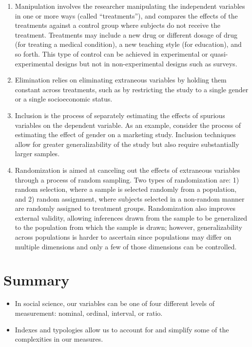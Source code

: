 \begin{enumerate}
	\item Manipulation involves the researcher manipulating the independent variables in one or more ways (called ``treatments''), and compares the effects of the treatments against a control group where subjects do not receive the treatment. Treatments may include a new drug or different dosage of drug (for treating a medical condition), a new teaching style (for education), and so forth. This type of control can be achieved in experimental or quasi-experimental designs but not in non-experimental designs such as surveys. 
	
	\item Elimination relies on eliminating extraneous variables by holding them constant across treatments, such as by restricting the study to a single gender or a single socioeconomic status. 
	
	\item Inclusion is the process of separately estimating the effects of spurious variables on the dependent variable. As an example, consider the process of estimating the effect of gender on a marketing study. Inclusion techniques allow for greater generalizability of the study but also require substantially larger samples. 
	
	\item Randomization is aimed at canceling out the effects of extraneous variables through a process of random sampling. Two types of randomization are: 1) random selection, where a sample is selected randomly from a population, and 2) random assignment, where subjects selected in a non-random manner are randomly assigned to treatment groups. Randomization also improves external validity, allowing inferences drawn from the sample to be generalized to the population from which the sample is drawn; however, generalizability across populations is harder to ascertain since populations may differ on multiple dimensions and only a few of those dimensions can be controlled.
	
\end{enumerate}

\section{Summary}\label{ch06:summary}

\begin{itemize}
	\setlength{\itemsep}{0pt}
	\setlength{\parskip}{0pt}
	\setlength{\parsep}{0pt}
	
	\item In social science, our variables can be one of four different levels of measurement: nominal, ordinal, interval, or ratio.
	\item Indexes and typologies allow us to account for and simplify some of the complexities in our measures.
	
\end{itemize}
